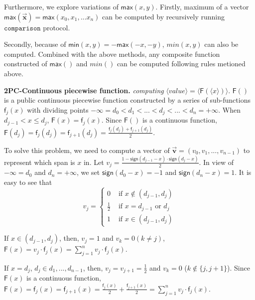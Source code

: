 \documentclass[letterpaper]{article} %
\begin{document}
    Furthermore, we explore variations of $\mathsf{max}(x,y)$.
    Firstly, maximum of a vector $\mathsf{max}(\overrightarrow{\mathbf{x}})=\mathsf{max}(x_{0},x_{1},...x_{n})$
    can be computed by recursively running $\mathtt{comparison}$ protocol.


    Secondly, because of $\mathsf{min}(x,y)=-\mathsf{max}(-x,-y)$,  $min(x,y)$ can also be computed.
    Combined with the above methods,
    any composite function constructed of $\mathsf{max}()$ and $min()$ can be computed following rules metioned above.

    \textbf{2PC-Continuous piecewise function.}
    \emph{computing}
    $\langle value\rangle  = \langle \mathsf{F}(\langle x\rangle)\rangle $.
    $\mathsf{F}()$ is a public continuous piecewise function constructed by a series of sub-functions $\mathsf{f}_{j}(x)$
    with dividing points $-\infty =d_{0}<d_{1}<...<d_{j}<...<d_{n}=+\infty$.
    When $d_{j-1}< x\leq d_{j}$, $\mathsf{F}(x) =\mathsf{f}_{j}(x)$.
    Since $\mathsf{F}()$ is a continuous function, $\mathsf{F}(d_{j}) =\mathsf{f}_{j}(d_{j})=\mathsf{f}_{j+1}(d_{j})=\frac{\mathsf{f}_{j}(d_{j})+\mathsf{f}_{j+1}(d_{j})}{2}$.


    To solve this problem, we need to compute a vector of
    $\overrightarrow{\textbf{v}}=(v_{0},v_{1},...,v_{n-1})$ to represent which span is $x$ in.
    Let $v_{j} = \frac{1-\mathsf{sign}(d_{j-1}-x)\cdot \mathsf{sign}(d_{j}-x)}{2}$.
    In view of $-\infty =d_{0}$ and $d_{n}=+\infty$,
    we set $\mathsf{sign}(d_{0}-x)=-1$ and $\mathsf{sign}(d_{n}-x)=1$.
    It is easy to see that
    $$v_{j}=\begin{cases}
        0 & \text{ if } x\notin (d_{j-1},d_{j}) \\
        \frac{1}{2} & \text{ if } x = d_{j-1} \text{ or } d_{j}\\
        1 & \text{ if } x\in (d_{j-1},d_{j})
        \end{cases}$$

    If $x\in (d_{j-1},d_{j})$, then, $v_{j}=1$ and $v_{k}=0 (k\neq j)$, $\mathsf{F}(x)=v_{j}\cdot \mathsf{f}_{j}(x)=\sum_{j=1}^{n}v_{j}\cdot \mathsf{f}_{j}(x)$.

    If $x=d_{j} $, $ d_{j}\in {d_{1},...,d_{n-1}}$,
    then, $v_{j}=v_{j+1}=\frac{1}{2}$ and $v_{k}=0$ ($ k\notin \{j,j+1\}$).
    Since $\mathsf{F}(x)$ is a continuous function,
    $\mathsf{F}(x)=\mathsf{f}_{j}(x)=\mathsf{f}_{j+1}(x)=\frac{\mathsf{f}_{j}(x)}{2}+\frac{\mathsf{f}_{j+1}(x)}{2}=\sum_{j=1}^{n}v_{j}\cdot \mathsf{f}_{j}(x)$.
\end{document}

